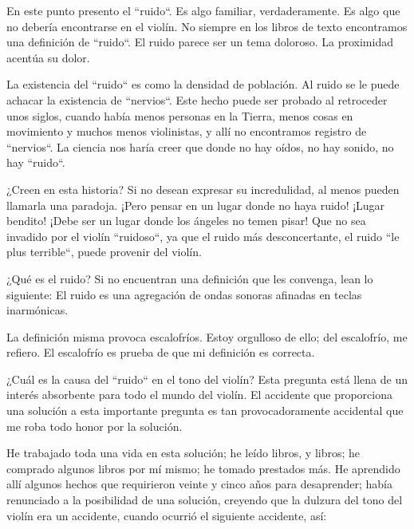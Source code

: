 En este punto presento el ``ruido``. 
Es algo familiar, verdaderamente. 
Es algo que no debería encontrarse en el violín. 
No siempre en los libros de texto encontramos una definición de ``ruido``. 
El ruido parece ser un tema doloroso. La proximidad acentúa su dolor.

La existencia del ``ruido`` es como la densidad de población. Al ruido se le puede achacar la existencia de ``nervios``. Este hecho puede ser probado al retroceder unos siglos, cuando había menos personas en la Tierra, menos cosas en movimiento y muchos menos violinistas, y allí no encontramos registro de ``nervios``. La ciencia nos haría creer que donde no hay oídos, no hay sonido, no hay ``ruido``.

¿Creen en esta historia? Si no desean expresar su incredulidad, al menos pueden llamarla una paradoja. ¡Pero pensar en un lugar donde no haya ruido! ¡Lugar bendito! ¡Debe ser un lugar donde los ángeles no temen pisar! Que no sea invadido por el violín ``ruidoso``, ya que el ruido más desconcertante, el ruido ``le plus terrible``, puede provenir del violín.

¿Qué es el ruido? Si no encuentran una definición que les convenga, lean lo siguiente: El ruido es una agregación de ondas sonoras afinadas en teclas inarmónicas.

La definición misma provoca escalofríos. Estoy orgulloso de ello; del escalofrío, me refiero. El escalofrío es prueba de que mi definición es correcta.

¿Cuál es la causa del ``ruido`` en el tono del violín? Esta pregunta está llena de un interés absorbente para todo el mundo del violín. El accidente que proporciona una solución a esta importante pregunta es tan provocadoramente accidental que me roba todo honor por la solución.

He trabajado toda una vida en esta solución; he leído libros, y libros; he comprado algunos libros por mí mismo; he tomado prestados más. He aprendido allí algunos hechos que requirieron veinte y cinco años para desaprender; había renunciado a la posibilidad de una solución, creyendo que la dulzura del tono del violín era un accidente, cuando ocurrió el siguiente accidente, así:
